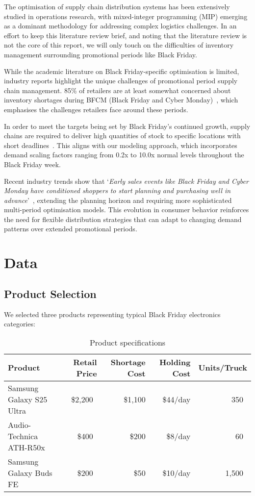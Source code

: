 \documentclass[a4paper,12pt]{article}
\begin{document}
The optimisation of supply chain distribution systems has been extensively studied in operations research, with mixed-integer programming (MIP) emerging as a dominant methodology for addressing complex logistics challenges.
In an effort to keep this literature review brief, and noting that the literature review is not the core of this report, we will only touch on the difficulties of inventory management surrounding promotional periods like Black Friday.

While the academic literature on Black Friday-specific optimisation is limited, industry reports highlight the unique challenges of promotional period supply chain management.
85\% of retailers are at least somewhat concerned about inventory shortages during BFCM (Black Friday and Cyber Monday)~\cite{anvyl2023black}, which emphasises the challenges retailers face around these periods.

In order to meet the targets being set by Black Friday's continued growth, supply chains are required to deliver high quantities of stock to specific locations with short deadlines~\cite{scmag2024black}.
This aligns with our modeling approach, which incorporates demand scaling factors ranging from 0.2x to 10.0x normal levels throughout the Black Friday week.

Recent industry trends show that `\textit{Early sales events like Black Friday and Cyber Monday have conditioned shoppers to start planning and purchasing well in advance}'~\cite{sc247consumer}, extending the planning horizon and requiring more sophisticated multi-period optimisation models.
This evolution in consumer behavior reinforces the need for flexible distribution strategies that can adapt to changing demand patterns over extended promotional periods.




\section{Data}\label{sec:data}

\subsection{Product Selection}\label{subsec:product-selection}
We selected three products representing typical Black Friday electronics categories:

\begin{table}[h]
\centering
\caption{Product specifications}
\begin{tabular}{lrrrr}
\toprule
Product & Retail Price & Shortage Cost & Holding Cost & Units/Truck \\
\midrule
Samsung Galaxy S25 Ultra & \$2,200~\cite{phonecost} & \$1,100 & \$44/day & 350~\cite{phonespecs} \\
Audio-Technica ATH-R50x & \$400~\cite{headphonescost} & \$200 & \$8/day & 60~\cite{headphonesspecs} \\
Samsung Galaxy Buds FE & \$200~\cite{earphonescost} & \$50 & \$10/day & 1,500~\cite{earphonesspecs} \\
\bottomrule
\end{tabular}\label{tab:table}
\end{table}
\end{document}
